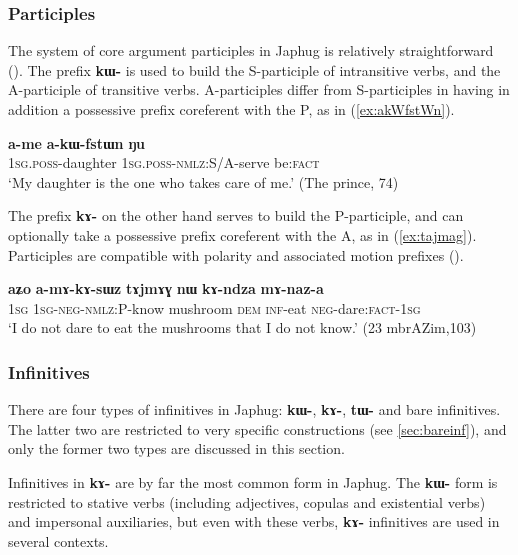 \documentclass[oneside,a4paper,11pt]{article}
\newcommand{\ipa}[1]{\textbf{\phon#1}} %
\begin{document}
\subsubsection{Participles}
The system of core argument participles in Japhug is relatively straightforward (\citealt{jacques16relatives}). The prefix \ipa{kɯ-} is used to build the S-participle of intransitive verbs, and the A-participle of transitive verbs. A-participles differ from S-participles in having in addition a possessive prefix coreferent with the P, as in (\ref{ex:akWfstWn}).

\begin{exe}
\ex \label{ex:akWfstWn}
\gll \ipa{a-me} 	\ipa{a-kɯ-fstɯn} 	\ipa{ŋu} \\
\textsc{1sg.poss}-daughter \textsc{1sg.poss}-\textsc{nmlz}:S/A-serve be:\textsc{fact} \\
\glt `My daughter is the one who takes care of me.' (The prince, 74)
\end{exe}

The prefix \ipa{kɤ-} on the other hand serves to build the P-participle, and can optionally take a possessive prefix coreferent with the A, as in (\ref{ex:tajmag}). Participles are compatible with polarity and associated motion prefixes (\citealt{jacques16relatives}).

\begin{exe}
   \ex \label{ex:tajmag}
   \gll
\ipa{aʑo}  	\ipa{a-mɤ-kɤ-sɯz}   	\ipa{tɤjmɤɣ}  	\ipa{nɯ}  	\ipa{kɤ-ndza}  	\ipa{mɤ-naz-a}  \\
\textsc{1sg} \textsc{1sg-neg-nmlz:P}-know mushroom \textsc{dem} \textsc{inf}-eat \textsc{neg}-dare:\textsc{fact}-\textsc{1sg} \\
\glt `I do not dare to eat the mushrooms that I do not know.' (23 mbrAZim,103)
\end{exe}

\subsubsection{Infinitives} \label{sec:infinitives}
There are four types of infinitives in Japhug: \ipa{kɯ-}, \ipa{kɤ-}, \ipa{tɯ-} and bare infinitives. The latter two are restricted to very specific constructions (see \ref{sec:bareinf}), and only the former two types are discussed in this section. 

Infinitives in \ipa{kɤ-} are by far the most common form in Japhug. The \ipa{kɯ-} form is restricted to stative verbs (including adjectives, copulas and existential verbs) and impersonal auxiliaries, but even with these verbs, \ipa{kɤ-} infinitives are used in several contexts. 
\end{document}
